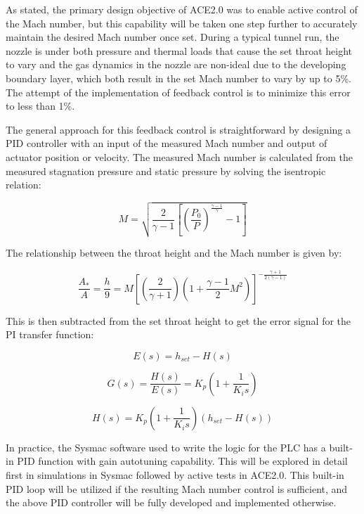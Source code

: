 As stated, the primary design objective of ACE2.0 was to enable active control of the Mach number, but this capability will be taken one step further to accurately maintain the desired Mach number once set. During a typical tunnel run, the nozzle is under both pressure and thermal loads that cause the set throat height to vary and the gas dynamics in the nozzle are non-ideal due to the developing boundary layer, which both result in the set Mach number to vary by up to 5\%. The attempt of the implementation of feedback control is to minimize this error to less than 1\%.

The general approach for this feedback control is straightforward by designing a PID controller with an input of the measured Mach number and output of actuator position or velocity. The measured Mach number is calculated from the measured stagnation pressure and static pressure by solving the isentropic relation:

\begin{equation} 
    M = \sqrt{\frac{2}{\gamma - 1} \left[\left(\frac{P_0}{P}\right)^{\frac{\gamma - 1}{\gamma}} - 1\right]}
\end{equation}

The relationship between the throat height and the Mach number is given by:

\begin{equation}
    \frac{A_*}{A} = \frac{h}{9} = M \left[ \left( \frac{2}{\gamma+1}  \right) \left( 1 + \frac{\gamma-1}{2} M^2  \right) \right]^{-\frac{\gamma+1}{2(\gamma-1)} }
\end{equation}

This is then subtracted from the set throat height to get the error signal for the PI transfer function:

\begin{equation}
    E(s) = h_{set} - H(s)
\end{equation}

\begin{equation}
    G(s) = \frac{H(s)}{E(s)} = K_p \left(1 + \frac{1}{K_i s}\right)
\end{equation}

\begin{equation}
    H(s) = K_p \left(1 + \frac{1}{K_i s}\right) \left(h_{set} - H(s)\right)
\end{equation}

In practice, the Sysmac software used to write the logic for the PLC has a built-in PID function with gain autotuning capability. This will be explored in detail first in simulations in Sysmac followed by active tests in ACE2.0. This built-in PID loop will be utilized if the resulting Mach number control is sufficient, and the above PID controller will be fully developed and implemented otherwise.

